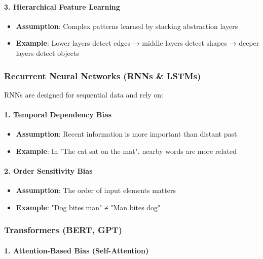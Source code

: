 \paragraph{3. Hierarchical Feature Learning}

\begin{itemize}
\item \textbf{Assumption}: Complex patterns learned by stacking abstraction layers
\item \textbf{Example}: Lower layers detect edges → middle layers detect shapes → deeper layers detect objects
\end{itemize}

\subsubsection{Recurrent Neural Networks (RNNs \& LSTMs)}

RNNs are designed for sequential data and rely on:

\paragraph{1. Temporal Dependency Bias}

\begin{itemize}
\item \textbf{Assumption}: Recent information is more important than distant past
\item \textbf{Example}: In "The cat sat on the mat", nearby words are more related
\end{itemize}

\paragraph{2. Order Sensitivity Bias}

\begin{itemize}
\item \textbf{Assumption}: The order of input elements matters
\item \textbf{Example}: "Dog bites man" ≠ "Man bites dog"
\end{itemize}

\subsubsection{Transformers (BERT, GPT)}

\paragraph{1. Attention-Based Bias (Self-Attention)}

